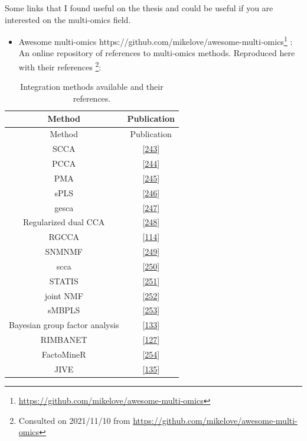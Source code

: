 \documentclass[
  a4paper,
]{book}
\DeclareRobustCommand{\href}[2]{#2\footnote{\url{#1}}}
\providecommand{\tightlist}{%
  \setlength{\itemsep}{0pt}\setlength{\parskip}{0pt}}
\begin{document}
Some links that I found useful on the thesis and could be useful if you are interested on the multi-omics field.

\begin{itemize}
\tightlist
\item
  \href{https://github.com/mikelove/awesome-multi-omics}{Awesome multi-omics https://github.com/mikelove/awesome-multi-omics} : An online repository of references to multi-omics methods. Reproduced here with their references \footnote{Consulted on 2021/11/10 from \url{https://github.com/mikelove/awesome-multi-omics}}:
\end{itemize}

\begin{longtable}[]{@{}cc@{}}
\caption{\label{tab:appendix-methods} Integration methods available and their references.}\tabularnewline
\toprule
Method & Publication \\
\midrule
\endfirsthead
\toprule
Method & Publication \\
\midrule
\endhead
SCCA & {[}\protect\hyperlink{ref-parkhomenko2009}{243}{]} \\
PCCA & {[}\protect\hyperlink{ref-waaijenborg2008}{244}{]} \\
PMA & {[}\protect\hyperlink{ref-witten2009}{245}{]} \\
sPLS & {[}\protect\hyperlink{ref-luxeacao2009}{246}{]} \\
gesca & {[}\protect\hyperlink{ref-hwang2009}{247}{]} \\
Regularized dual CCA & {[}\protect\hyperlink{ref-soneson2010}{248}{]} \\
RGCCA & {[}\protect\hyperlink{ref-tenenhaus_regularized_2011}{114}{]} \\
SNMNMF & {[}\protect\hyperlink{ref-zhang2011}{249}{]} \\
scca & {[}\protect\hyperlink{ref-lee2011}{250}{]} \\
STATIS & {[}\protect\hyperlink{ref-abdi2012}{251}{]} \\
joint NMF & {[}\protect\hyperlink{ref-zhang2012}{252}{]} \\
sMBPLS & {[}\protect\hyperlink{ref-li2012}{253}{]} \\
Bayesian group factor analysis & {[}\protect\hyperlink{ref-virtanen2012}{133}{]} \\
RIMBANET & {[}\protect\hyperlink{ref-zhu2012}{127}{]} \\
FactoMineR & {[}\protect\hyperlink{ref-abdi2013}{254}{]} \\
JIVE & {[}\protect\hyperlink{ref-lock2013a}{135}{]} \\

\end{longtable}
\end{document}
